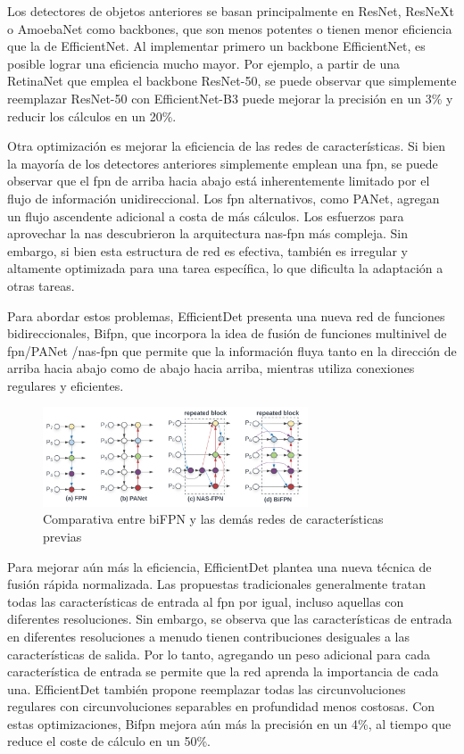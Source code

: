 Los detectores de objetos anteriores se basan principalmente en ResNet, ResNeXt o AmoebaNet como backbones, que son menos potentes o tienen menor eficiencia que la de EfficientNet. Al implementar primero un backbone EfficientNet, es posible lograr una eficiencia mucho mayor. Por ejemplo, a partir de una RetinaNet que emplea el backbone ResNet-50, se puede observar que simplemente reemplazar ResNet-50 con EfficientNet-B3 puede mejorar la precisión en un 3\% y reducir los cálculos en un 20\%.

Otra optimización es mejorar la eficiencia de las redes de características. Si bien la mayoría de los detectores anteriores simplemente emplean una \gls{fpn}, se puede observar que el \gls{fpn} de arriba hacia abajo está inherentemente limitado por el flujo de información unidireccional. Los \gls{fpn} alternativos, como PANet, agregan un flujo ascendente adicional a costa de más cálculos. Los esfuerzos para aprovechar la \gls{nas} descubrieron la arquitectura \gls{nas}-\gls{fpn} más compleja. Sin embargo, si bien esta estructura de red es efectiva, también es irregular y altamente optimizada para una tarea específica, lo que dificulta la adaptación a otras tareas.

Para abordar estos problemas, EfficientDet presenta una nueva red de funciones bidireccionales, Bi\gls{fpn}, que incorpora la idea de fusión de funciones multinivel de \gls{fpn}/PANet /\gls{nas}-\gls{fpn} que permite que la información fluya tanto en la dirección de arriba hacia abajo como de abajo hacia arriba, mientras utiliza conexiones regulares y eficientes.

\begin{figure}[ht]
\centering
\includegraphics[width=0.7\textwidth]{img/chapters/estado-del-arte/comparativa_fpn+panet+nas-fpn+bifpn.png}
\caption{\label{fig:comparativa-bifpn}Comparativa entre biFPN y las demás redes de características previas \cite{tan2020efficientdet}}
\end{figure}

Para mejorar aún más la eficiencia, EfficientDet plantea una nueva técnica de fusión rápida normalizada. Las propuestas tradicionales generalmente tratan todas las características de entrada al \gls{fpn} por igual, incluso aquellas con diferentes resoluciones. Sin embargo, se observa que las características de entrada en diferentes resoluciones a menudo tienen contribuciones desiguales a las características de salida. Por lo tanto, agregando un peso adicional para cada característica de entrada se permite que la red aprenda la importancia de cada una. EfficientDet también propone reemplazar todas las circunvoluciones regulares con circunvoluciones separables en profundidad menos costosas. Con estas optimizaciones, Bi\gls{fpn} mejora aún más la precisión en un 4\%, al tiempo que reduce el coste de cálculo en un 50\%.

